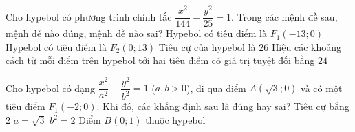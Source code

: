 \begin{ex}%
	Cho hypebol có phương trình chính tắc $\dfrac{x^2}{144}-\dfrac{y^2}{25}=1$. Trong các mệnh đề sau, mệnh  đề nào đúng, mệnh đề nào sai?
	\choiceTF 
		{\True Hypebol có tiêu điểm là $F_1(-13;0)$} 
		{Hypebol có  tiêu điểm là $F_2(0;13)$}
		{\True Tiêu cự  của hypebol là $26$}
		{\True Hiệu  các khoảng cách từ mỗi điểm trên hypebol tới hai tiêu điểm có giá trị tuyệt đối bằng $24$}
\end{ex}

\begin{ex}%
	Cho hypebol có  dạng $\dfrac{x^2}{a^2}-\dfrac{y^2}{b^2}=1$ ($a,b>0$), đi qua điểm $A\left(\sqrt{3};0\right)$ và có một tiêu điểm $F_1(-2;0)$. Khi đó, các khẳng định sau là đúng hay sai?
	\choiceTF 
		 {Tiêu cự bằng $2$}
		{\True $  a=\sqrt{3}$}
		{$b^2=2  $}
		 {Điểm $B(0;1)$ thuộc hypebol}
\end{ex}

